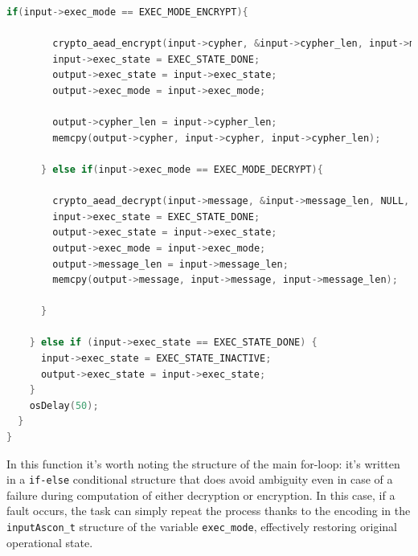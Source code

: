 \documentclass[a4paper, 12pt]{article}
\begin{document}
\begin{onehalfspace}
\begin{itemize}
{\begin{lstlisting}[language=C]
      if(input->exec_mode == EXEC_MODE_ENCRYPT){
        
        crypto_aead_encrypt(input->cypher, &input->cypher_len, input->message, input->message_len, input->ad, input->ad_len, NULL, input->nonce, input->key);
        input->exec_state = EXEC_STATE_DONE;
        output->exec_state = input->exec_state;
        output->exec_mode = input->exec_mode;

        output->cypher_len = input->cypher_len;
        memcpy(output->cypher, input->cypher, input->cypher_len);
        
      } else if(input->exec_mode == EXEC_MODE_DECRYPT){
        
        crypto_aead_decrypt(input->message, &input->message_len, NULL, input->cypher, input->cypher_len, input->ad, input->ad_len, input->nonce, input->key);
        input->exec_state = EXEC_STATE_DONE;
        output->exec_state = input->exec_state;
        output->exec_mode = input->exec_mode;
        output->message_len = input->message_len;
        memcpy(output->message, input->message, input->message_len);
      
      }

    } else if (input->exec_state == EXEC_STATE_DONE) {
      input->exec_state = EXEC_STATE_INACTIVE;
      output->exec_state = input->exec_state;
    }
    osDelay(50);
  }
}
    \end{lstlisting}
    In this function it's worth noting the structure of the main for-loop: it's written in a \texttt{if-else} conditional structure that does avoid ambiguity even in case of a failure during computation of either decryption or encryption. In this case, if a fault occurs, the task can simply repeat the process thanks to the encoding in the \texttt{inputAscon\_t} structure of the variable \texttt{exec\_mode}, effectively restoring original operational state.
    }
\end{itemize}


\end{onehalfspace}
\end{document}

